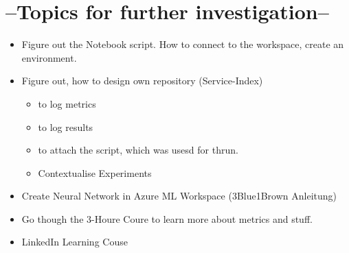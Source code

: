 \section{--Topics for further investigation--}
\begin{itemize}
	\item Figure out the Notebook script. How to connect to the workspace, create an environment.
	\item Figure out, how to design own  repository (Service-Index) 
	\begin{itemize}
		\item to log metrics 
		\item to log results
		\item to attach the script, which was usesd for thrun.
		\item Contextualise Experiments
	\end{itemize}
	\item Create Neural Network in Azure ML Workspace (3Blue1Brown Anleitung)
	\item Go though the 3-Houre Coure to learn more about metrics and stuff.
\item LinkedIn Learning Couse
\end{itemize}

